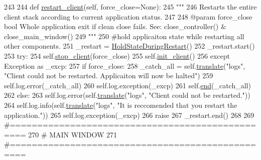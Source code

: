 \begin{DoxyCode}
243 
244     \textcolor{keyword}{def }\hyperlink{classcommotion__client_1_1commotion__client_1_1CommotionClientApplication_af40aa0ed2df54b7edb7f3e474b336a63}{restart\_client}(self, force\_close=None):
245         \textcolor{stringliteral}{"""}
246 \textcolor{stringliteral}{        Restarts the entire client stack according to current application status.}
247 \textcolor{stringliteral}{}
248 \textcolor{stringliteral}{        @param force\_close bool Whole application exit if clean close fails. See: close\_controller() &
       close\_main\_window()}
249 \textcolor{stringliteral}{        """}
250         \textcolor{comment}{#hold applicaiton state while restarting all other components.}
251         \_restart = \hyperlink{classcommotion__client_1_1commotion__client_1_1HoldStateDuringRestart}{HoldStateDuringRestart}()
252         \_restart.start()
253         \textcolor{keywordflow}{try}:
254             self.\hyperlink{classcommotion__client_1_1commotion__client_1_1CommotionClientApplication_a63104a06ba20d9b679c22b542fd90c94}{stop\_client}(force\_close)
255             self.\hyperlink{classcommotion__client_1_1commotion__client_1_1CommotionClientApplication_adbf0b01d9e64047a4ad7971161d457b1}{init\_client}()
256         \textcolor{keywordflow}{except} Exception \textcolor{keyword}{as} \_excp:
257             \textcolor{keywordflow}{if} force\_close:
258                 \_catch\_all = self.\hyperlink{classcommotion__client_1_1commotion__client_1_1CommotionClientApplication_a57e951c9b241fb0e0c70055b4ca1b6f7}{translate}(\textcolor{stringliteral}{"logs"}, \textcolor{stringliteral}{"Client could not be restarted. Applicaiton
       will now be halted"})
259                 self.log.error(\_catch\_all)
260                 self.log.exception(\_excp)
261                 self.\hyperlink{classcommotion__client_1_1commotion__client_1_1CommotionClientApplication_af2043aac2ebc25f55b73ec317d6ea463}{end}(\_catch\_all)
262             \textcolor{keywordflow}{else}:
263                 self.log.error(self.\hyperlink{classcommotion__client_1_1commotion__client_1_1CommotionClientApplication_a57e951c9b241fb0e0c70055b4ca1b6f7}{translate}(\textcolor{stringliteral}{"logs"}, \textcolor{stringliteral}{"Client could not be restarted."}))
264                 self.log.info(self.\hyperlink{classcommotion__client_1_1commotion__client_1_1CommotionClientApplication_a57e951c9b241fb0e0c70055b4ca1b6f7}{translate}(\textcolor{stringliteral}{"logs"}, \textcolor{stringliteral}{"It is reccomended that you restart the
       application."}))
265                 self.log.exception(\_excp)
266                 \textcolor{keywordflow}{raise}
267         \_restart.end()
268 
269 \textcolor{comment}{#=================================================}
270 \textcolor{comment}{#                 MAIN WINDOW}
271 \textcolor{comment}{#=================================================}
        
\end{DoxyCode}
